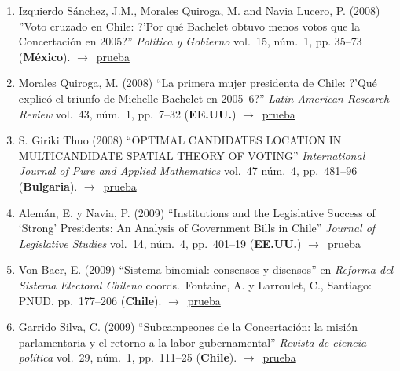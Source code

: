 \documentclass[12 pt, letter]{article}
\newenvironment{CitasMiTrabajo}{
    \begin{footnotesize}
    \begin{enumerate}[label={\footnotesize\emph{cita~\arabic*}},ref=\arabic*] %
        \setlength{\itemsep}{.1\itemsep}
        \setlength{\parskip}{.1\parskip}
    }{\end{enumerate}\end{footnotesize}}
\begin{document}
\begin{CitasMiTrabajo}
        \item Izquierdo S\'anchez, J.M., Morales Quiroga, M. and Navia Lucero, P. (2008)
        ''Voto cruzado en Chile: ?'Por qu\'e Bachelet obtuvo menos votos que la Concertaci\'on en 2005?''
        \emph{Pol\'itica y Gobierno} vol.\ 15, n\'um.\ 1, pp. 35--73 (\textbf{M\'exico}). $\rightarrow$~\href{http://ericmagar.com/cv/cites/mrs/izquierdoetal2008pyg.pdf}{prueba}

        \item Morales Quiroga, M. (2008)
        ``La primera mujer presidenta de Chile: ?'Qu\'e explic\'o el triunfo de Michelle Bachelet en 2005--6?''
        \emph{Latin American Research Review} vol.\ 43, n\'um.\ 1, pp.\ 7--32 (\textbf{EE.UU.}) $\rightarrow$~\href{http://ericmagar.com/cv/cites/mrs/morales2008larr.excerpt.pdf}{prueba}

        \item S. Giriki Thuo (2008)
        ``OPTIMAL CANDIDATES LOCATION IN MULTICANDIDATE SPATIAL THEORY OF VOTING''
        \emph{International Journal of Pure and Applied Mathematics} vol.\ 47 n\'um.\ 4, pp.\ 481--96 (\textbf{Bulgaria}). $\rightarrow$~\href{http://ericmagar.com/cv/cites/mrs/thuoOptimalLocation2008ijpam.pdf}{prueba}

        \item Alem\'an, E. y Navia, P. (2009)
        ``Institutions and the Legislative Success of `Strong'
        Presidents: An Analysis of Government Bills in Chile''
        \emph{Journal of Legislative Studies}
        vol.\ 14, n\'um.\ 4, pp.\ 401--19 (\textbf{EE.UU.}) $\rightarrow$~\href{http://ericmagar.com/cv/cites/mrs/alemanNavia.pdf}{prueba}

        \item Von Baer, E. (2009)
        ``Sistema binomial: consensos y disensos'' en
        \emph{Reforma del Sistema Electoral Chileno} coords.\ Fontaine, A. y Larroulet, C., Santiago: PNUD, pp.\ 177--206 (\textbf{Chile}). $\rightarrow$~\href{http://ericmagar.com/cv/cites/mrs/vonBaer2009.pdf}{prueba}

        \item Garrido Silva, C. (2009)
        ``Subcampeones de la Concertaci\'on: la misi\'on parlamentaria y el retorno a la labor gubernamental''
        \emph{Revista de ciencia pol\'itica}
        vol.\ 29, n\'um.\ 1, pp.\ 111--25 (\textbf{Chile}). $\rightarrow$~\href{http://ericmagar.com/cv/cites/mrs/garrido2009rcp.pdf}{prueba}


\end{CitasMiTrabajo}
\end{document}
